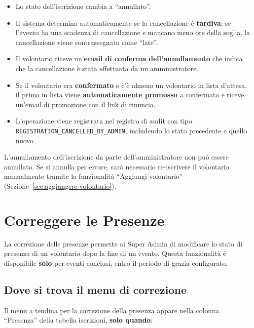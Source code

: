 \documentclass[a4paper,11pt,oneside]{book}
\begin{document}
\begin{itemize}[leftmargin=1.5em]
  \item Lo stato dell'iscrizione cambia a ``annullato''.
  \item Il sistema determina automaticamente se la cancellazione \`e \textbf{tardiva}: se l'evento ha una scadenza di cancellazione e mancano meno ore della soglia, la cancellazione viene contrassegnata come ``late''.
  \item Il volontario riceve un'\textbf{email di conferma dell'annullamento} che indica che la cancellazione \`e stata effettuata da un amministratore.
  \item Se il volontario era \textbf{confermato} e c'\`e almeno un volontario in lista d'attesa, il primo in lista viene \textbf{automaticamente promosso} a confermato e riceve un'email di promozione con il link di rinuncia.
  \item L'operazione viene registrata nel registro di audit con tipo \texttt{REGISTRATION\_CANCELLED\_BY\_ADMIN}, includendo lo stato precedente e quello nuovo.
\end{itemize}

\begin{warningbox}
L'annullamento dell'iscrizione da parte dell'amministratore non pu\`o essere annullato. Se si annulla per errore, sar\`a necessario re-iscrivere il volontario manualmente tramite la funzionalit\`a ``Aggiungi volontario'' (Sezione~\ref{sec:aggiungere-volontario}).
\end{warningbox}

\section{Correggere le Presenze}
\label{sec:correggere-presenze}

La correzione delle presenze permette ai Super Admin di modificare lo stato di presenza di un volontario dopo la fine di un evento. Questa funzionalit\`a \`e disponibile \textbf{solo} per eventi conclusi, entro il periodo di grazia configurato.

\subsection{Dove si trova il menu di correzione}

Il menu a tendina per la correzione della presenza appare nella colonna ``Presenza'' della tabella iscrizioni, \textbf{solo quando}:
\end{document}
